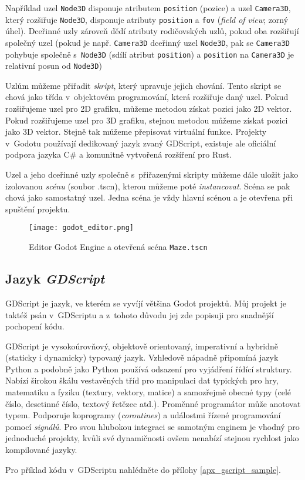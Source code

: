 Například uzel \texttt{Node3D} disponuje atributem \texttt{position} (pozice) a uzel \texttt{Camera3D}, který rozšiřuje \texttt{Node3D}, disponuje atributy \texttt{position} a \texttt{fov} (\textit{field of view}; zorný úhel). Dceřinné uzly zároveň dědí atributy rodičovských uzlů, pokud oba rozšiřují společný uzel (pokud je např. \texttt{Camera3D} dceřinný uzel \texttt{Node3D}, pak se \texttt{Camera3D} pohybuje společně s~\texttt{Node3D} (sdílí atribut \texttt{position}) a \texttt{position} na \texttt{Camera3D} je relativní posun od \texttt{Node3D})

Uzlům můžeme přiřadit \textit{skript}, který upravuje jejich chování. Tento skript se chová jako třída v~objektovém programování, která rozšiřuje daný uzel. Pokud rozšiřujeme uzel pro 2D grafiku, můžeme metodou získat pozici jako 2D vektor. Pokud rozšiřujeme uzel pro 3D grafiku, stejnou metodou můžeme získat pozici jako 3D vektor. Stejně tak můžeme přepisovat virtuální funkce. Projekty v~Godotu používají dedikovaný jazyk zvaný GDScript, existuje ale oficiální podpora jazyka C\# a komunitně vytvořená rozšíření pro Rust.

Uzel a jeho dceřinné uzly společně s~přiřazenými skripty můžeme dále uložit jako izolovanou \textit{scénu} (soubor .tscn), kterou můžeme poté \textit{instancovat}. Scéna se pak chová jako samostatný uzel. Jedna scéna je vždy hlavní scénou a je otevřena při spuštění projektu.

\begin{figure}[H]
  \centering
  \texttt{[image: godot\_editor.png]}
  \caption{Editor Godot Engine a otevřená scéna \texttt{Maze.tscn}}
  \label{godot_editor_maze_tscn}
\end{figure}

\subsection{Jazyk \textit{GDScript}}

GDScript je jazyk, ve kterém se vyvíjí většina Godot projektů. Můj projekt je taktéž psán v~GDScriptu a z~tohoto důvodu jej zde popisuji pro snadnější pochopení kódu.

GDScript je vysokoúrovňový, objektově orientovaný, imperativní a hybridně (staticky i dynamicky) typovaný jazyk. Vzhledově nápadně připomíná jazyk Python a podobně jako Python používá odsazení pro vyjádření řídící struktury. Nabízí širokou škálu vestavěných tříd pro manipulaci dat typických pro hry, matematiku a fyziku (textury, vektory, matice) a samozřejmě obecné typy (celé číslo, desetinné číslo, textový řetězec atd.). Proměnné programátor může anotovat typem. Podporuje koprogramy (\textit{coroutines}) a událostmi řízené programování pomocí \textit{signálů}. Pro svou hlubokou integraci se samotným enginem je vhodný pro jednoduché projekty, kvůli své dynamičnosti ovšem nenabízí stejnou rychlost jako kompilované jazyky. \cite{gdscript_reference}

Pro příklad kódu v~GDScriptu nahlédněte do přílohy \ref{apx_gscript_sample}.